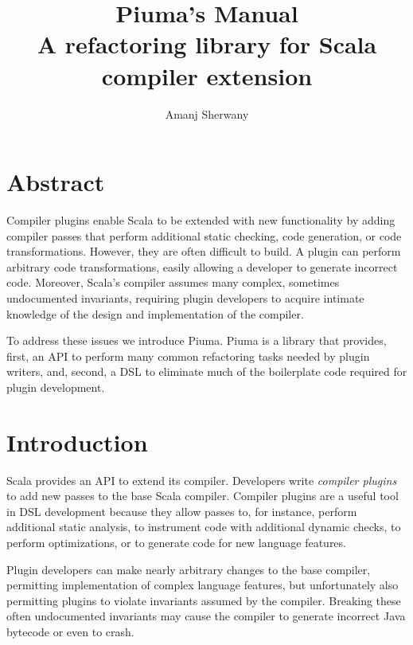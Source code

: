\documentclass{article}
\begin{document}
\setlength{\pdfpageheight}{\paperheight}
\setlength{\pdfpagewidth}{\paperwidth}

\title{
 Piuma's Manual\\
 \small{A refactoring library for Scala compiler extension}
}
  
\author{Amanj Sherwany} 


  


\maketitle

\section{Abstract}

Compiler plugins enable Scala to be extended with new functionality by adding
compiler passes that perform additional static checking, code generation, or
code transformations. However, they are often difficult to build. A plugin can
perform arbitrary code transformations, easily allowing a developer to generate
incorrect code. Moreover, Scala's compiler assumes many complex, sometimes
undocumented invariants, requiring plugin developers to acquire intimate
knowledge of the design and implementation of the compiler.  

To address these issues we introduce Piuma. Piuma is a library that
provides, first, an API to perform many common refactoring tasks needed by
plugin writers, and, second, a DSL to eliminate much of the boilerplate code
required for plugin development. 


\section{Introduction}

Scala provides an API to extend its compiler.  Developers write \emph{compiler
  plugins} to add new passes to the base Scala compiler.  Compiler plugins are
a useful tool in DSL development because they allow passes to, for instance,
perform additional static analysis, to instrument code with additional dynamic
checks, to perform optimizations, or to generate code for new language
features.

Plugin developers can make nearly arbitrary changes to the base compiler,
permitting implementation of complex language features, but unfortunately also
permitting plugins to violate invariants assumed by the compiler.  Breaking
these often undocumented invariants may cause the compiler to generate
incorrect Java bytecode or even to crash.
\end{document}
